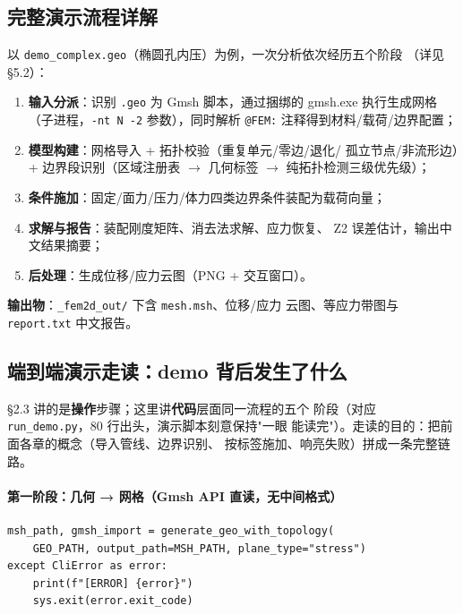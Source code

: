 \documentclass[12pt,a4paper]{ctexart}
\newcommand{\fem}{\Verb}
\begin{document}
\subsection{完整演示流程详解}

以 \fem|demo_complex.geo|（椭圆孔内压）为例，一次分析依次经历五个阶段
（详见 §5.2）：

\begin{enumerate}[leftmargin=*]
  \item \textbf{输入分派}：识别 \fem|.geo| 为 Gmsh 脚本，通过捆绑的
        gmsh.exe 执行生成网格（子进程，\texttt{-nt N -2} 参数），同时解析
        \fem|@FEM:| 注释得到材料/载荷/边界配置；
  \item \textbf{模型构建}：网格导入 + 拓扑校验（重复单元/零边/退化/
        孤立节点/非流形边）+ 边界段识别（区域注册表 $\rightarrow$ 几何标签
        $\rightarrow$ 纯拓扑检测三级优先级）；
  \item \textbf{条件施加}：固定/面力/压力/体力四类边界条件装配为载荷向量；
  \item \textbf{求解与报告}：装配刚度矩阵、消去法求解、应力恢复、
        Z2 误差估计，输出中文结果摘要；
  \item \textbf{后处理}：生成位移/应力云图（PNG + 交互窗口）。
\end{enumerate}

\textbf{输出物}：\fem|_fem2d_out/| 下含 \fem|mesh.msh|、位移/应力
云图、等应力带图与 \fem|report.txt| 中文报告。

\subsection{端到端演示走读：demo 背后发生了什么}

§2.3 讲的是\textbf{操作}步骤；这里讲\textbf{代码}层面同一流程的五个
阶段（对应 \fem|run_demo.py|，80 行出头，演示脚本刻意保持"一眼
能读完"）。走读的目的：把前面各章的概念（导入管线、边界识别、
按标签施加、响亮失败）拼成一条完整链路。

\paragraph{第一阶段：几何 → 网格（Gmsh API 直读，无中间格式）}

\begin{lstlisting}
msh_path, gmsh_import = generate_geo_with_topology(
    GEO_PATH, output_path=MSH_PATH, plane_type="stress")
except CliError as error:
    print(f"[ERROR] {error}")
    sys.exit(error.exit_code)
\end{lstlisting}
\end{document}
